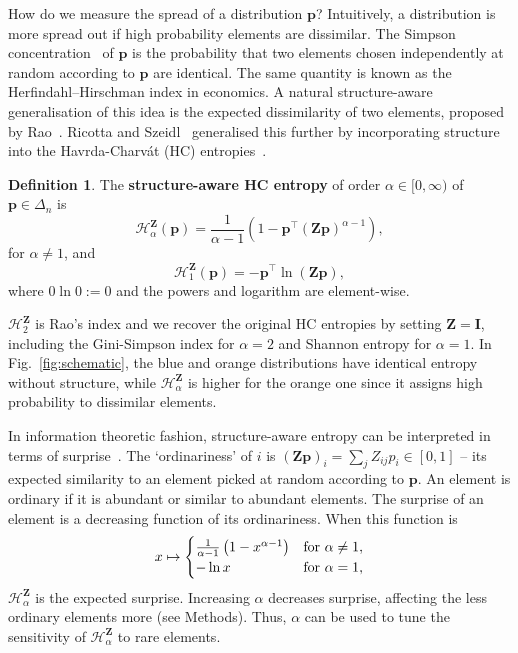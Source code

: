 \documentclass[aps,pre,floats,floatfix,superscriptaddress,twocolumn,final,10pt]{revtex4-2}
\theoremstyle{definition}
\newtheorem{definition}{Definition}
\renewcommand{\vec}[1]{\mathbf{#1}}
\newcommand{\entropy}[3]{\mathcal{H}^{#1}_{#2}\left(#3\right)}
\newcommand{\entropyname}[2]{\mathcal{H}^{#1}_{#2}}
\begin{document}
How do we measure the spread of a distribution $\vec{p}$? Intuitively, a distribution is more spread out if high probability elements are dissimilar. The Simpson concentration~\cite{Simpson1949} of $\vec{p}$ is the probability that two elements chosen independently at random according to $\vec{p}$ are identical. The same quantity is known as the Herfindahl–Hirschman index in economics. A natural structure-aware generalisation of this idea is the expected dissimilarity of two elements, proposed by Rao~\cite{Rao1982}. Ricotta and Szeidl~\cite{Ricotta2006} generalised this further by incorporating structure into the Havrda-Charv\'at (HC) entropies~\cite{Havrda1967}.

\begin{definition}
    The \textbf{structure-aware HC entropy} of order $\alpha \in [0, \infty)$ of $\mathbf{p} \in \Delta_n$ is
    \begin{equation}
        \entropy{\vec{Z}}{\alpha}{\vec{p}} = \frac{1}{\alpha - 1} \left( 1 - \vec{p}^\top (\vec{Zp})^{\alpha -1} \right),
    \end{equation}
    for $\alpha \neq 1$, and
    \begin{equation}
        \entropy{\vec{Z}}{1}{\vec{p}}= - \vec{p}^\top \ln (\vec{Z p}),
    \end{equation}
    where $0 \ln 0 := 0$ and the powers and logarithm are element-wise.
\label{def:structure_aware_entropy}
\end{definition}

$\entropyname{\vec{Z}}{2}$ is Rao's index and we recover the original HC entropies by setting $\vec{Z}=\vec{I}$, including the Gini-Simpson index for $\alpha=2$ and Shannon entropy for $\alpha=1$. In Fig.~\ref{fig:schematic}, the blue and orange distributions have identical entropy without structure, while $\entropyname{\vec{Z}}{\alpha}$ is higher for the orange one since it assigns high probability to dissimilar elements.

In information theoretic fashion, structure-aware entropy can be interpreted in terms of surprise~\cite{Leinster2012}. The `ordinariness' of $i$ is $(\vec{Zp})_i = \sum_j Z_{ij}p_i \in [0,1]$ -- its expected similarity to an element picked at random according to $\vec{p}$. An element is ordinary if it is abundant or similar to abundant elements. The surprise of an element is a decreasing function of its ordinariness. When this function is
\begin{equation}
    x \mapsto \begin{cases}
        \frac{1}{\alpha - 1} \left( 1 - x^{\alpha-1} \right) & \textnormal{for } \alpha \neq 1,\\
        - \ln x & \textnormal{for } \alpha=1,
    \end{cases}
\label{eq:surprise}
\end{equation}
$\entropyname{\vec{Z}}{\alpha}$ is the expected surprise. Increasing $\alpha$ decreases surprise, affecting the less ordinary elements more (see Methods). Thus, $\alpha$ can be used to tune the sensitivity of $\entropyname{\vec{Z}}{\alpha}$ to rare elements.
\end{document}
